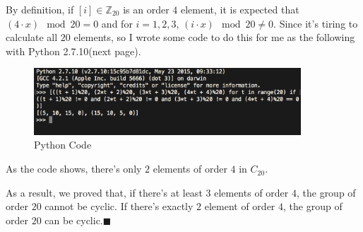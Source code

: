\documentclass[11pt]{article}
\begin{document}
	By definition, if $[i] \in \mathbb{Z}_{20}$ is an order $4$ element, it is expected that $(4 \cdot x) \mod 20 = 0$ and for $i = 1, 2 ,3$, $(i \cdot x) \mod 20 \neq 0$. Since it's tiring to calculate all $20$ elements, so I wrote some code to do this for me as the following with Python 2.7.10(next page).
	
	\begin{figure}[H]
        \begin{center}
        \includegraphics[width=10cm]{./imgs/code.png}
        \caption{Python Code}
        \end{center}
    \end{figure}
    
    As the code shows, there's only $2$ elements of order $4$ in $C_{20}$. 
    
    As a result, we proved that, if there's at least $3$ elements of order $4$, the group of order $20$ cannot be cyclic. If there's exactly $2$ element of order $4$, the group of order $20$ can be cyclic.$\blacksquare$
		
\end{document}
